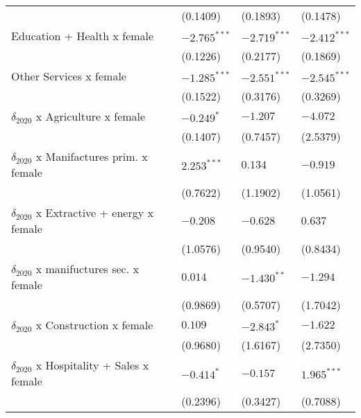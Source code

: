 \begin{tabular}{llll}
                                                   &           (0.1409) &           (0.1893) &           (0.1478) \\
Education + Health x female                        &     $-2.765^{***}$ &     $-2.719^{***}$ &     $-2.412^{***}$ \\
                                                   &           (0.1226) &           (0.2177) &           (0.1869) \\
Other Services x female                            &     $-1.285^{***}$ &     $-2.551^{***}$ &     $-2.545^{***}$ \\
                                                   &           (0.1522) &           (0.3176) &           (0.3269) \\
$\delta_{2020}$ x Agriculture x female             &         $-0.249^*$ &           $-1.207$ &           $-4.072$ \\
                                                   &           (0.1407) &           (0.7457) &           (2.5379) \\
$\delta_{2020}$ x Manifactures prim. x female      &      $2.253^{***}$ &            $0.134$ &           $-0.919$ \\
                                                   &           (0.7622) &           (1.1902) &           (1.0561) \\
$\delta_{2020}$ x Extractive + energy x female     &           $-0.208$ &           $-0.628$ &            $0.637$ \\
                                                   &           (1.0576) &           (0.9540) &           (0.8434) \\
$\delta_{2020}$ x manifuctures sec. x female       &            $0.014$ &      $-1.430^{**}$ &           $-1.294$ \\
                                                   &           (0.9869) &           (0.5707) &           (1.7042) \\
$\delta_{2020}$ x Construction x female            &            $0.109$ &         $-2.843^*$ &           $-1.622$ \\
                                                   &           (0.9680) &           (1.6167) &           (2.7350) \\
$\delta_{2020}$ x Hospitality + Sales x female     &         $-0.414^*$ &           $-0.157$ &      $1.965^{***}$ \\
                                                   &           (0.2396) &           (0.3427) &           (0.7088) \\

\end{tabular}
